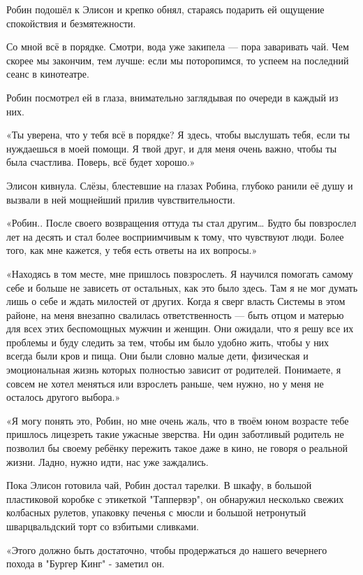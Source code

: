 \documentclass[a5paper, 9pt,
final, openany, twoside=true]{memoir}
\begin{document}
Робин подошёл к Элисон и крепко обнял, стараясь подарить ей ощущение спокойствия и безмятежности.

Со мной всё в порядке. Смотри, вода уже закипела — пора заваривать чай. Чем скорее мы закончим, тем лучше: если мы поторопимся, то успеем на последний сеанс в кинотеатре.

Робин посмотрел ей в глаза, внимательно заглядывая по очереди в каждый из них.

«Ты уверена, что у тебя всё в порядке? Я здесь, чтобы выслушать тебя, если ты нуждаешься в моей помощи. Я твой друг, и для меня очень важно, чтобы ты была счастлива. Поверь, всё будет хорошо.»

Элисон кивнула. Слёзы, блестевшие на глазах Робина, глубоко ранили её душу и вызвали в ней мощнейший прилив чувствительности.

«Робин.. После своего возвращения оттуда ты стал другим… Будто бы повзрослел лет на десять и стал более восприимчивым к тому, что чувствуют люди. Более того, как мне кажется, у тебя есть ответы на их вопросы.»

«Находясь в том месте, мне пришлось повзрослеть. Я научился помогать самому себе и больше не зависеть от остальных, как это было здесь. Там я не мог думать лишь о себе и ждать милостей от других. Когда я сверг власть Системы в этом районе, на меня внезапно свалилась ответственность — быть отцом и матерью для всех этих беспомощных мужчин и женщин. Они ожидали, что я решу все их проблемы и буду следить за тем, чтобы им было удобно жить, чтобы у них всегда были кров и пища. Они были словно малые дети, физическая и эмоциональная жизнь которых полностью зависит от родителей. Понимаете, я совсем не хотел меняться или взрослеть раньше, чем нужно, но у меня не осталось другого выбора.»

«Я могу понять это, Робин, но мне очень жаль, что в твоём юном возрасте тебе пришлось лицезреть такие ужасные зверства. Ни один заботливый родитель не позволил бы своему ребёнку пережить такое даже в кино, не говоря о реальной жизни. Ладно, нужно идти, нас уже заждались.\bigskip

Пока Элисон готовила чай, Робин достал тарелки. В шкафу, в большой пластиковой коробке с этикеткой "Таппервэр", он обнаружил несколько свежих колбасных рулетов, упаковку печенья с мюсли и большой нетронутый шварцвальдский торт со взбитыми сливками.

«Этого должно быть достаточно, чтобы продержаться до нашего вечернего похода в "Бургер Кинг" - заметил он.
\end{document}
